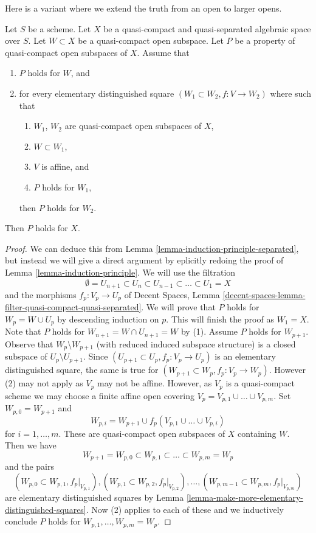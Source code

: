 \noindent
Here is a variant where we extend the truth from an open to larger opens.

\begin{lemma}
\label{lemma-induction-principle-enlarge}
Let $S$ be a scheme. Let $X$ be a quasi-compact and quasi-separated
algebraic space over $S$. Let $W \subset X$ be a quasi-compact open
subspace. Let $P$ be a property of quasi-compact open subspaces of $X$.
Assume that
\begin{enumerate}
\item $P$ holds for $W$, and
\item for every elementary distinguished square
$(W_1 \subset W_2, f : V \to W_2)$ where 
such that
\begin{enumerate}
\item $W_1$, $W_2$ are quasi-compact open subspaces of $X$,
\item $W \subset W_1$,
\item $V$ is affine, and
\item $P$ holds for $W_1$,
\end{enumerate}
then $P$ holds for $W_2$.
\end{enumerate}
Then $P$ holds for $X$.
\end{lemma}

\begin{proof}
We can deduce this from Lemma \ref{lemma-induction-principle-separated},
but instead we will give a direct argument by eplicitly redoing the proof of
Lemma \ref{lemma-induction-principle}. We will use the filtration
$$
\emptyset = U_{n + 1} \subset
U_n \subset U_{n - 1} \subset \ldots \subset U_1 = X
$$
and the morphisms $f_p : V_p \to U_p$ of
Decent Spaces, Lemma
\ref{decent-spaces-lemma-filter-quasi-compact-quasi-separated}.
We will prove that $P$ holds for $W_p = W \cup U_p$ by descending
induction on $p$. This will finish the proof as $W_1 = X$.
Note that $P$ holds for $W_{n + 1} = W \cap U_{n + 1} = W$
by (1). Assume $P$ holds for $W_{p + 1}$. Observe that
$W_p \setminus W_{p + 1}$ (with reduced induced subspace structure)
is a closed subspace of $U_p \setminus U_{p + 1}$.
Since $(U_{p + 1} \subset U_p, f_p : V_p \to U_p)$ is an elementary
distinguished square, the same is true for
$(W_{p + 1} \subset W_p, f_p : V_p \to W_p)$.
However (2) may not apply as $V_p$ may not be affine.
However, as $V_p$ is a quasi-compact scheme we may choose
a finite affine open covering $V_p = V_{p, 1} \cup \ldots \cup V_{p, m}$.
Set $W_{p, 0} = W_{p + 1}$ and
$$
W_{p, i} = W_{p + 1} \cup f_p(V_{p, 1} \cup \ldots \cup V_{p, i})
$$
for $i = 1, \ldots, m$. These are quasi-compact open subspaces of $X$
containing $W$. Then we have
$$
W_{p + 1} = W_{p, 0} \subset
W_{p, 1} \subset \ldots \subset
W_{p, m} = W_p
$$
and the pairs
$$
(W_{p, 0} \subset W_{p, 1}, f_p|_{V_{p, 1}}),
(W_{p, 1} \subset W_{p, 2}, f_p|_{V_{p, 2}}),\ldots,
(W_{p, m - 1} \subset W_{p, m}, f_p|_{V_{p, m}})
$$
are elementary distinguished squares by
Lemma \ref{lemma-make-more-elementary-distinguished-squares}.
Now (2) applies to each of these and we inductively
conclude $P$ holds for $W_{p, 1}, \ldots, W_{p, m} = W_p$.
\end{proof}



